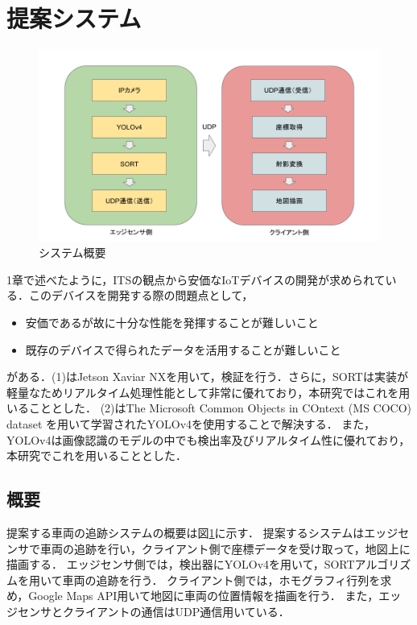 \documentclass[technicalreport]{ieicej}
\begin{document}
\section{提案システム}
\begin{figure}[t]
  \includegraphics*[bb=0 0 950 500, width=1\linewidth]{./images/system.png}
  \caption{システム概要}
  \label{tab:system}
  \end{figure}
1章で述べたように，ITSの観点から安価なIoTデバイスの開発が求められている．このデバイスを開発する際の問題点として，
\begin{itemize}
  \item[(1)]安価であるが故に十分な性能を発揮することが難しいこと
  \item[(2)]既存のデバイスで得られたデータを活用することが難しいこと
\end{itemize}
がある．(1)はJetson Xaviar NXを用いて，検証を行う．さらに，SORTは実装が軽量なためリアルタイム処理性能として非常に優れており，本研究ではこれを用いることとした．
(2)はThe Microsoft Common Objects in COntext (MS COCO) dataset\cite{lin2014microsoft}
を用いて学習されたYOLOv4を使用することで解決する．
また，YOLOv4は画像認識のモデルの中でも検出率及びリアルタイム性に優れており，本研究でこれを用いることとした．

\subsection{概要}
提案する車両の追跡システムの概要は図\ref{tab:system}に示す．
提案するシステムはエッジセンサで車両の追跡を行い，クライアント側で座標データを受け取って，地図上に描画する．
エッジセンサ側では，検出器にYOLOv4を用いて，SORTアルゴリズム\cite{wojke2017simple}を用いて車両の追跡を行う．
クライアント側では，ホモグラフィ行列を求め，Google Maps API\cite{googlemap}用いて地図に車両の位置情報を描画を行う．
また，エッジセンサとクライアントの通信はUDP通信用いている．
\end{document}
